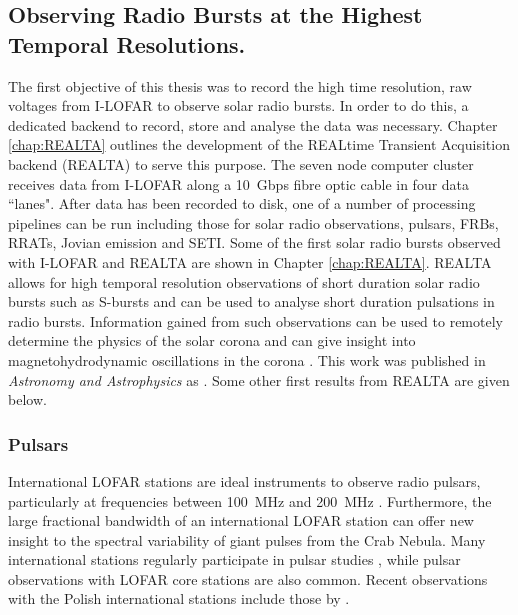\subsection{Observing Radio Bursts at the Highest Temporal Resolutions.}
The first objective of this thesis was to record the high time resolution, raw voltages from I-LOFAR to observe solar radio bursts.
In order to do this, a dedicated backend to record, store and analyse the data was necessary. Chapter \ref{chap:REALTA} outlines the development of the REALtime Transient Acquisition backend (REALTA) to serve this purpose. The seven node computer cluster receives data from I-LOFAR along a 10~Gbps fibre optic cable in four data ``lanes". After data has been recorded to disk, one of a number of processing pipelines can be run including those for solar radio observations, pulsars, FRBs, RRATs, Jovian emission and SETI. Some of the first solar radio bursts observed with I-LOFAR and REALTA are shown in Chapter \ref{chap:REALTA}. REALTA allows for high temporal resolution observations of short duration solar radio bursts such as S-bursts and can be used to analyse short duration pulsations in radio bursts. Information gained from such observations can be used to remotely determine the physics of the solar corona \citep{Morosan2015, Clarke2019} and can give insight into magnetohydrodynamic oscillations in the corona \citep{Carley2019}. This work was published in \textit{Astronomy and Astrophysics} as \cite{Murphy2021b}. Some other first results from REALTA are given below.
\subsubsection{Pulsars}

International LOFAR stations are ideal instruments to observe radio pulsars, particularly at frequencies between 100~MHz and 200~MHz \citep{Stappers2011, Bilous2014, Noutsos2015}. Furthermore, the large fractional bandwidth of an international LOFAR station can offer new insight to the spectral variability of giant pulses from the Crab Nebula. Many international stations regularly participate in pulsar studies \citep[for example,][]{Mereghetti2016, Bondonneau2017, Hermsen2018, Donner2019}, while pulsar observations with LOFAR core stations \citep[for example,][]{Bilous2014, Bilous2020} are also common. Recent observations with the Polish international stations include those by \cite{Blaszkiewicz2020}. 

